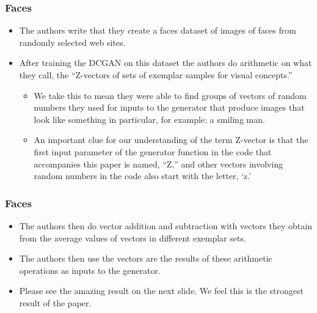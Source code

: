 \documentclass{beamer}
\begin{document}

\begin{frame}[allowframebreaks]
\frametitle{Faces}
\begin{itemize}
\item The authors write that they create a faces dataset of images of faces from
  randomly selected web sites.

\item After training the DCGAN on this dataset the authors do arithmetic on
what they call, the ``Z-vectors of sets of exemplar samples for visual concepts.''

\begin{itemize}
  \item We take this to mean they were able to find groups of vectors of random
  numbers they used for inputs to the generator that produce images that look like
  something in particular, for example: a smiling man.

  \item An important clue for our understanding of the term Z-vector is that the
  first input parameter of the generator function in the code that accompanies this
  paper \cite{dcganCode} is named, ``Z,'' and other vectors involving random numbers
  in the code also start with the letter, `z.'
  \end{itemize}

\end{itemize}
\end{frame}


\begin{frame}[allowframebreaks]
\frametitle{Faces}
\begin{itemize}
\item The authors then do vector addition and subtraction with vectors they obtain
from the average values of vectors in different exemplar sets.

\item The authors then use the vectors are the results of these arithmetic operations
as inputs to the generator.

\item Please see the amazing result on the next slide. We feel this is the strongest
result of the paper. 
\end{itemize}
\end{frame}

\end{document}
